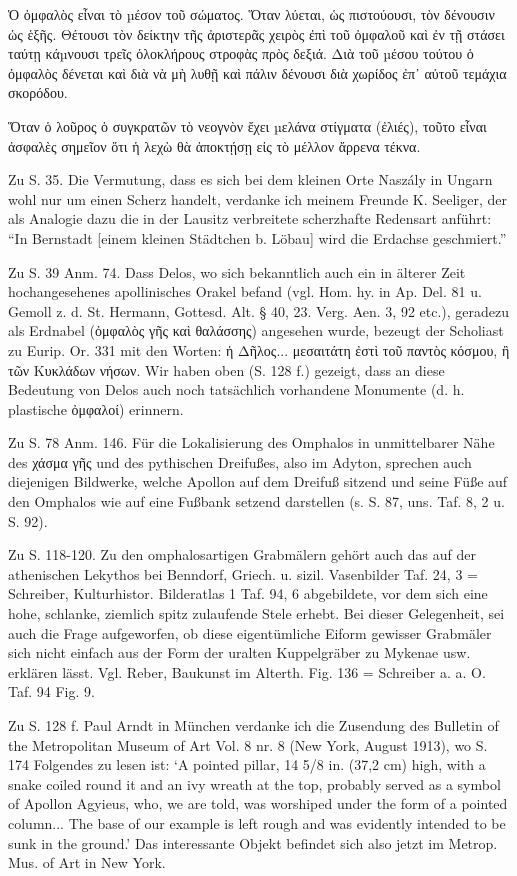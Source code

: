 \documentclass[a4paper, 11pt, oneside]{article}
\begin{document}
Ὁ ὀμφαλὸς εἶναι τὸ µέσον τοῦ σώματος. Ὅταν λύεται, ὡς πιστούουσι, τὸν δένουσιν ὡς ἑξῆς. Θέτουσι τὸν δείκτην τῆς ἀριστερᾶς χειρὸς ἐπὶ τοῦ ὀμφαλοῦ καὶ ἐν τῇ στάσει ταύτῃ κάµνουσι τρεῖς ὁλοκλήρους στροφὰς πρὸς δεξιά. Διὰ τοῦ µέσου τούτου ὁ ὀμφαλὸς δένεται καὶ διὰ νὰ μὴ λυθῇ καὶ πάλιν δένουσι διὰ χωρίδος ἐπ᾽ αὐτοῦ τεμάχια σκορόδου.

Ὅταν ὁ λοῦρος ὁ συγκρατῶν τὸ νεογνὸν ἔχει µελάνα στίγματα (ἐλιές), τοῦτο εἶναι ἀσφαλὲς σημεῖον ὅτι ἡ λεχὼ θὰ ἀποκτῄσῃ εἰς τὸ μέλλον ἄρρενα τέκνα.

Zu S. 35. Die Vermutung, dass es sich bei dem kleinen Orte Naszály in Ungarn wohl nur um einen Scherz handelt, verdanke ich meinem Freunde K. Seeliger, der als Analogie dazu die in der Lausitz verbreitete scherzhafte Redensart anführt: "`In Bernstadt [einem kleinen Städtchen b. Löbau] wird die Erdachse geschmiert."'

Zu S. 39 Anm. 74. Dass Delos, wo sich bekanntlich auch ein in älterer Zeit hochangesehenes apollinisches Orakel befand (vgl. Hom. hy. in Ap. Del. 81 u. Gemoll z. d. St. Hermann, Gottesd. Alt. § 40, 23. Verg. Aen. 3, 92 etc.), geradezu als Erdnabel (ὀμφαλὸς γῆς καὶ θαλάσσης) angesehen wurde, bezeugt der Scholiast zu Eurip. Or. 331 mit den Worten: ἡ Δῆλος... μεσαιτάτη ἐστὶ τοῦ παντὸς κόσμου, ἢ τῶν Κυκλάδων νήσων. Wir haben oben (S. 128 f.) gezeigt, dass an diese Bedeutung von Delos auch noch tatsächlich vorhandene Monumente (d. h. plastische ὀμφαλοί) erinnern.

Zu S. 78 Anm. 146. Für die Lokalisierung des Omphalos in unmittelbarer Nähe des χάσμα γῆς und des pythischen Dreifußes, also im Adyton, sprechen auch diejenigen Bildwerke, welche Apollon auf dem Dreifuß sitzend und seine Füße auf den Omphalos wie auf eine Fußbank setzend darstellen (s. S. 87, uns. Taf. 8, 2 u. S. 92).

Zu S. 118-120. Zu den omphalosartigen Grabmälern gehört auch das auf der athenischen Lekythos bei Benndorf, Griech. u. sizil. Vasenbilder Taf. 24, 3 = Schreiber, Kulturhistor. Bilderatlas 1 Taf. 94, 6 abgebildete, vor dem sich eine hohe, schlanke, ziemlich spitz zulaufende Stele erhebt. Bei dieser Gelegenheit, sei auch die Frage aufgeworfen, ob diese eigentümliche Eiform gewisser Grabmäler sich nicht einfach aus der Form der uralten Kuppelgräber zu Mykenae usw. erklären lässt. Vgl. Reber, Baukunst im Alterth. Fig. 136 = Schreiber a. a. O. Taf. 94 Fig. 9.

Zu S. 128 f. Paul Arndt in München verdanke ich die Zusendung des Bulletin of the Metropolitan Museum of Art Vol. 8 nr. 8 (New York, August 1913), wo S. 174 Folgendes zu lesen ist: `A pointed pillar, 14 5/8 in. (37,2 cm) high, with a snake coiled round it and an ivy wreath at the top, probably served as a symbol of Apollon Agyieus, who, we are told, was worshiped under the form of a pointed column... The base of our example is left rough and was evidently intended to be sunk in the ground.' Das interessante Objekt befindet sich also jetzt im Metrop. Mus. of Art in New York.
\clearpage
\end{document}
